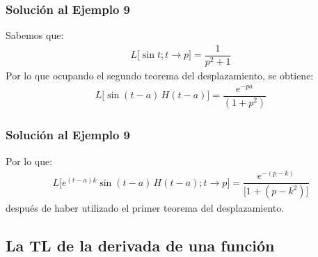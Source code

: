 \begin{frame}
\frametitle{Solución al Ejemplo 9}
Sabemos que:
\pause
\begin{align*}
L \big[  \sin t; t \to p  \big] = \dfrac{1}{p^{2} + 1}
\end{align*}
\pause
Por lo que ocupando el segundo teorema del desplazamiento, se obtiene:
\pause
\begin{align*}
L \big[  \sin (t - a) \, H (t- a)  \big] = \dfrac{e^{-p a}}{(1 + p^{2})}
\end{align*}
\end{frame}
\begin{frame}
\frametitle{Solución al Ejemplo 9}
Por lo que:
\pause
\begin{align*}
L \big[  e^{(t-a) k} \sin (t {-} a) \, H (t {-} a); t \to p \big] = \dfrac{e^{-(p - k)}}{\big[  1 {+} (p {-} k^{2})  \big]}
\end{align*}
después de haber utilizado el primer teorema del desplazamiento.
\end{frame}

\subsection{La TL de la derivada de una función}

